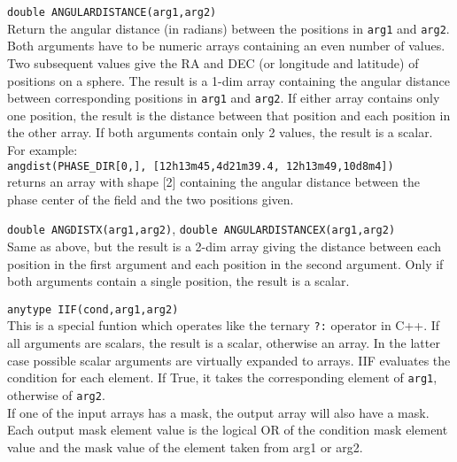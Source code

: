 \begin{description}
              \texttt{double ANGULARDISTANCE(arg1,arg2)}\\
    Return the angular distance (in radians) between the
    positions in \texttt{arg1} and \texttt{arg2}. Both arguments have
    to be numeric arrays containing an even number of values. Two subsequent values 
    give the RA and DEC (or longitude and latitude) of positions on a
    sphere. The result is a 1-dim array containing the angular
    distance between corresponding positions in \texttt{arg1} and
    \texttt{arg2}.
    If either array contains only one position, the result is the
    distance between that position and each position in the other array.
    If both arguments contain only 2 values, the result is a scalar.
    For example:
    \\\texttt{angdist(PHASE\_DIR[0,], [12h13m45,4d21m39.4, 12h13m49,10d8m4])}
    \\returns an array with shape [2] containing the angular
    distance between the phase center of the field and the two positions given. 
  \item[] \texttt{double ANGDISTX(arg1,arg2)},
              \texttt{double ANGULARDISTANCEX(arg1,arg2)}\\
    Same as above, but the result is a 2-dim array giving the distance
    between each position in the first argument and each position in
    the second argument. Only if both arguments contain a single
    position, the result is a scalar.
  \item[] \texttt{anytype IIF(cond,arg1,arg2)}\\
    This is a special funtion which operates like the ternary \texttt{?:}
    operator in C++. 
    If all arguments are scalars, the result is a scalar, otherwise
    an array. In the latter case possible scalar arguments are
    virtually expanded to arrays.
    IIF evaluates the condition for each element. If True, it takes
    the corresponding element of \texttt{arg1}, otherwise of
    \texttt{arg2}.
    \\If one of the input arrays has a mask, the output array will
    also have a mask. Each output mask element value is the logical OR of the
    condition mask element value and the mask value of the element taken
    from arg1 or arg2.
\end{description}

